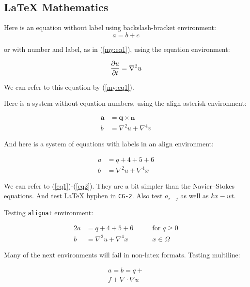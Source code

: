\documentclass[%
oneside,                 %
final,                   %
10pt]{article}
\theoremstyle{definition}
\begin{document}
\begin{enumerate}

\section{{\LaTeX} Mathematics}

Here is an equation without label using backslash-bracket environment:
\[ a = b + c \]

or with number and label, as in (\ref{my:eq1}), using the equation environment:

\begin{equation}
{\partial u\over\partial t} = \nabla^2 u \label{my:eq1}
\end{equation}

We can refer to this equation by (\ref{my:eq1}).

Here is a system without equation numbers, using the align-asterisk environment:

\begin{align*}
\pmb{a} &= \pmb{q}\times\pmb{n} \\ 
b &= \nabla^2 u + \nabla^4 v
\end{align*}

And here is a system of equations with labels in an align environment:

\begin{align}
a &= q + 4 + 5+ 6 \label{eq1} \\ 
b &= \nabla^2 u + \nabla^4 x \label{eq2}
\end{align}

We can refer to (\ref{eq1})-(\ref{eq2}). They are a bit simpler than
the Navier--Stokes equations. And test {\LaTeX} hyphen in \texttt{CG-2}.
Also test $a_{i-j}$ as well as $kx-wt$.

Testing \texttt{alignat} environment:

\begin{alignat}{2}
a &= q + 4 + 5+ 6\qquad & \mbox{for } q\geq 0 \label{eq1a} \\ 
b &= \nabla^2 u + \nabla^4 x & x\in\Omega \label{eq2a}
\end{alignat}

Many of the next environments will fail in non-latex formats.
Testing multiline:

\begin{multline}
a = b = q + \\ 
  f + \nabla\cdot\nabla u
\label{multiline:eq1}
\end{multline}


\end{enumerate}
\end{document}
